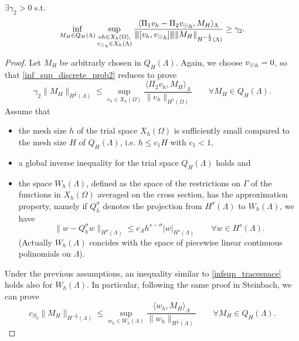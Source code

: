 \begin{theorem}
$\exists \gamma _2 >0$ s.t.
\begin{equation}\label{inf_sup_discrete_prob2}
\inf_{M_H \in Q_H(\Lambda)} 
\sup_{\substack{vh \in X_h(\Omega),\\ {\vd}_h \in X_h(\Lambda)} }\frac{\langle \Pi_1 v_h - \Pi_2 {\vd}_h, M_H \rangle _{\Lambda} } {\vertiii{[v_h, {\vd}_h]} \|M_H\|_{H^{-\frac 12 }(\Lambda)}  } 
\geq \gamma _2. 
\end{equation}
\end{theorem}
\begin{proof}
Let $M_H$ be arbitrarly chosen in $Q_H(\Lambda)$. Again, we choose ${v_{\odot}}_h =0$, so that \eqref{inf_sup_discrete_prob2} reduces to prove
\begin{equation*}
\gamma _2 \|M_H\|_{H^{\frac 12}(\Lambda)}
\leq 
\sup_{v_h \in X_h(\Omega)} \frac{ \langle \Pi_2 v_h , M_H \rangle _{\Lambda} } {\|v_h\|_{H^1(\Omega)} } \qquad \forall M_H \in Q_H(\Lambda).
\end{equation*}
Assume that
\begin{itemize}
\item the mesh size $h$ of the trial space $X_h(\Omega)$ is sufficiently small compared to the mesh size $H$ of $Q_H(\Lambda)$, i.e. $h \leq c_1 H$ with $c_1 < 1$,
\item a global inverse inequality for the trial space $Q_H(\Lambda)$ holds and
\item the space $W_h(\Lambda)$, defined as the space of the restrictions on $\Gamma$ of the functions in $X_h(\Omega)$ averaged on the cross section, has the approximation property, namely if $Q_h^{\sigma}$ denotes the projection from $H^\sigma (\Lambda)$ to $W_h(\Lambda)$, we have
\begin{equation*}
\|w-Q_h^{\sigma} w\|_{H^{\sigma} (\Lambda)} \leq c_A h^{s-\sigma} |w|_{H^s(\Lambda)} \qquad \forall w \in H^s(\Lambda).
\end{equation*}
(Actually $W_h(\Lambda)$ concides with the space of piecewise linear continuous polinomials on $\Lambda$).
\end{itemize}
Under the previous assumptions, an inequality similar to \eqref{infsup_tracespace} holds also for $W_h(\Lambda)$. In particular, following the same proof in Steinbach, we can prove 
\begin{equation}
c_{S_2} \|M_H\|_{H^{-\frac 12}(\Lambda)} \leq 
\sup_{w_h \in W_h(\Lambda)} \frac{ \langle w_h, M_H \rangle _{\Lambda} } {\|w_h\|_{H^{\frac 12}(\Lambda)}} \qquad \forall M_H \in Q_H(\Lambda).
\end{equation}

\end{proof}
